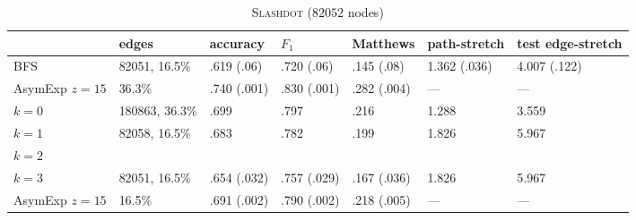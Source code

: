 \documentclass[a4paper,final,notitlepage,11pt,svgnames]{scrartcl}
\begin{document}
\begin{table}[htpb]
	\centering
	\caption{\textsc{Slashdot} ($82052$ nodes) \label{tab:slash}}
	\begin{tabular}{lllllll}
		\toprule
		& edges          & accuracy    & $F_1$       & Matthews    & path-stretch & test edge-stretch \\
		\midrule
		BFS            & 82051, 16.5\%  & .619 (.06)  & .720 (.06)  & .145 (.08)  & 1.362 (.036) & 4.007 (.122)\\
		AsymExp $z=15$ & 36.3\%         & .740 (.001) & .830 (.001) & .282 (.004) & ---          & --- \\
		$k=0$          & 180863, 36.3\% & .699        & .797        & .216        & 1.288        & 3.559 \\
		$k=1$          & 82058, 16.5\%  & .683        & .782        & .199        & 1.826        & 5.967 \\
		$k=2$          &                &             &             &             &              & \\
		$k=3$          & 82051, 16.5\%  & .654 (.032) & .757 (.029) & .167 (.036) & 1.826        & 5.967 \\
		AsymExp $z=15$ & 16.5\%         & .691 (.002) & .790 (.002) & .218 (.005) & ---          & --- \\
		\bottomrule
	\end{tabular}
\end{table}
\end{document}
